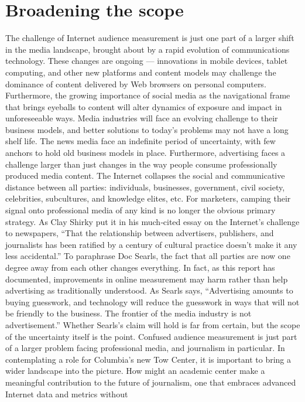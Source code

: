\section{Broadening the scope}
The challenge of Internet audience measurement is just one part of a
larger shift in the media landscape, brought about by a rapid evolution of
communications technology. These changes are ongoing — innovations in
mobile devices, tablet computing, and other new platforms and content
models may challenge the dominance of content delivered by Web
browsers on personal computers. Furthermore, the growing importance of
social media as the navigational frame that brings eyeballs to content will
alter dynamics of exposure and impact in unforeseeable ways. Media
industries will face an evolving challenge to their business models, and
better solutions to today’s problems may not have a long shelf life.
The news media face an indefinite period of uncertainty, with few anchors
to hold old business models in place. Furthermore, advertising faces a
challenge larger than just changes in the way people consume
professionally produced media content. The Internet collapses the social
and communicative distance between all parties: individuals, businesses,
government, civil society, celebrities, subcultures, and knowledge elites,
etc. For marketers, camping their signal onto professional media of any
kind is no longer the obvious primary strategy. As Clay Shirky put it in
his much‐cited essay on the Internet’s challenge to newspapers, ``That the
relationship between advertisers, publishers, and journalists has been
ratified by a century of cultural practice doesn’t make it any less
accidental.''
To paraphrase Doc Searls, the fact that all parties are now one degree
away from each other changes everything. In fact, as this report has
documented, improvements in online measurement may harm rather than
help advertising as traditionally understood. As Searls says, ``Advertising
amounts to buying guesswork, and technology will reduce the guesswork
in ways that will not be friendly to the business. The frontier of the media
industry is not advertisement.''
Whether Searls’s claim will hold is far from certain, but the scope of the
uncertainty itself is the point. Confused audience measurement is just part
of a larger problem facing professional media, and journalism in
particular. In contemplating a role for Columbia’s new Tow Center, it is
important to bring a wider landscape into the picture. How might an
academic center make a meaningful contribution to the future of
journalism, one that embraces advanced Internet data and metrics without
